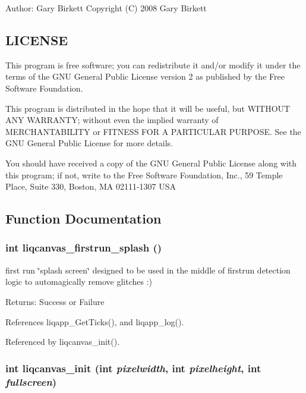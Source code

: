 \begin{Desc}
\item[Author:]Gary Birkett Copyright (C) 2008 Gary Birkett\end{Desc}
\subsection{LICENSE}\label{de/d77/liqui_8c_LICENSE}
This program is free software; you can redistribute it and/or modify it under the terms of the GNU General Public License version 2 as published by the Free Software Foundation.

This program is distributed in the hope that it will be useful, but WITHOUT ANY WARRANTY; without even the implied warranty of MERCHANTABILITY or FITNESS FOR A PARTICULAR PURPOSE. See the GNU General Public License for more details.

You should have received a copy of the GNU General Public License along with this program; if not, write to the Free Software Foundation, Inc., 59 Temple Place, Suite 330, Boston, MA 02111-1307 USA 

\subsection{Function Documentation}
\subsubsection[{liqcanvas\_\-firstrun\_\-splash}]{\setlength{\rightskip}{0pt plus 5cm}int liqcanvas\_\-firstrun\_\-splash ()}\label{d6/df5/liqcanvas_8c_28541ca509c0f3205eb7e170afabd2d8}


first run \char`\"{}splash screen\char`\"{} designed to be used in the middle of firstrun detection logic to automagically remove glitches :) \begin{Desc}
\item[Returns:]Success or Failure \end{Desc}


References liqapp\_\-GetTicks(), and liqapp\_\-log().

Referenced by liqcanvas\_\-init().
\subsubsection[{liqcanvas\_\-init}]{\setlength{\rightskip}{0pt plus 5cm}int liqcanvas\_\-init (int {\em pixelwidth}, \/  int {\em pixelheight}, \/  int {\em fullscreen})}\label{d6/df5/liqcanvas_8c_f779cfa1bb880b708379639904ae0703}


